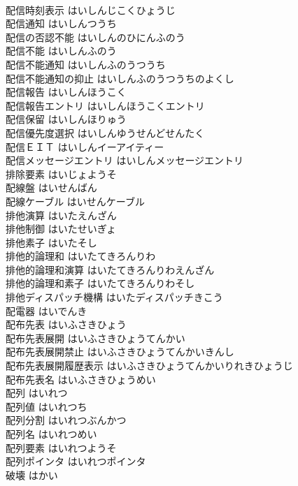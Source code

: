 \documentclass[8pt]{extreport}
\begin{document}
\begin{CJK}{UTF8}{min}
\\	配信時刻表示	はいしんじこくひょうじ	
\\	配信通知	はいしんつうち	
\\	配信の否認不能	はいしんのひにんふのう	
\\	配信不能	はいしんふのう	
\\	配信不能通知	はいしんふのうつうち	
\\	配信不能通知の抑止	はいしんふのうつうちのよくし	
\\	配信報告	はいしんほうこく	
\\	配信報告エントリ	はいしんほうこくエントリ	
\\	配信保留	はいしんほりゅう	
\\	配信優先度選択	はいしんゆうせんどせんたく	
\\	配信ＥＩＴ	はいしんイーアイティー	
\\	配信メッセージエントリ	はいしんメッセージエントリ	
\\	排除要素	はいじょようそ	
\\	配線盤	はいせんばん	
\\	配線ケーブル	はいせんケーブル	
\\	排他演算	はいたえんざん	
\\	排他制御	はいたせいぎょ	
\\	排他素子	はいたそし	
\\	排他的論理和	はいたてきろんりわ	
\\	排他的論理和演算	はいたてきろんりわえんざん	
\\	排他的論理和素子	はいたてきろんりわそし	
\\	排他ディスパッチ機構	はいたディスパッチきこう	
\\	配電器	はいでんき	
\\	配布先表	はいふさきひょう	
\\	配布先表展開	はいふさきひょうてんかい	
\\	配布先表展開禁止	はいふさきひょうてんかいきんし	
\\	配布先表展開履歴表示	はいふさきひょうてんかいりれきひょうじ	
\\	配布先表名	はいふさきひょうめい	
\\	配列	はいれつ	
\\	配列値	はいれつち	
\\	配列分割	はいれつぶんかつ	
\\	配列名	はいれつめい	
\\	配列要素	はいれつようそ	
\\	配列ポインタ	はいれつポインタ	
\\	破壊	はかい	

\end{CJK}
\end{document}
